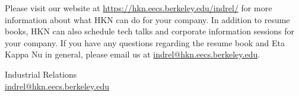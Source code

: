 \documentclass[11pt]{article}
\begin{document}
Please visit our website at \url{https://hkn.eecs.berkeley.edu/indrel/} for more information about what HKN can do for
your company. In addition to resume books, HKN can also schedule tech talks and corporate information
sessions for your company. If you have any questions regarding the resume book and Eta Kappa Nu in
general, please email us at \url{indrel@hkn.eecs.berkeley.edu}.
	\begin{list}{}{\setlength{\itemsep}{-2mm} \setlength{\leftmargin}{0pt}}
    
        {%
            \item {{ name }}
        {%
    
	\end{list}

Industrial Relations \\
\url{indrel@hkn.eecs.berkeley.edu}
\end{document}
